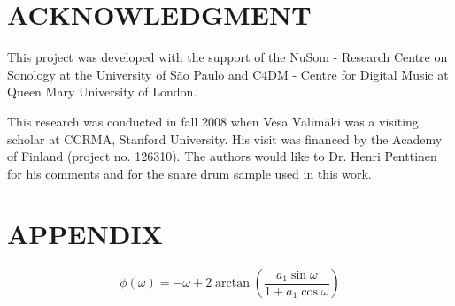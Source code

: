 \documentclass{aes2e}
\begin{document}
\begin{extract}
\section{ACKNOWLEDGMENT}
This project was developed with the support of the NuSom  - Research Centre on Sonology at the University of São Paulo and C4DM - Centre for Digital Music at Queen Mary University of London.

This research was conducted in fall 2008 when Vesa V\"alim\"aki was a visiting scholar at CCRMA, Stanford University. His visit was financed by the Academy of Finland (project no. 126310). The authors would like to Dr. Henri Penttinen for his comments and for the snare drum sample used in this work.




\begin{thebibliography}{99}
%
%
%
%
%
%
%  
\end{thebibliography}

\appendix
\section*{APPENDIX}
\begin{equation}
\phi (\omega ) =  - \omega  + 2\arctan \left( {\frac{{a_1 \sin \omega }}{{1 + a_1 \cos \omega }}} \right)
\end{equation}


\end{extract}
\end{document}
